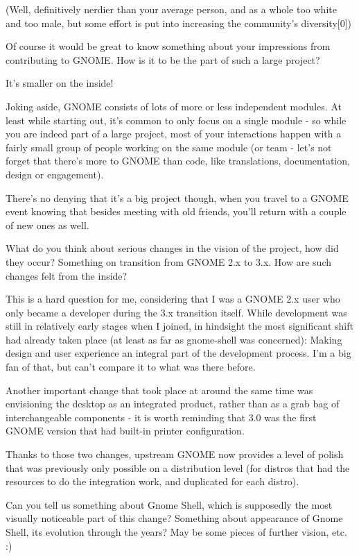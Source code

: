 \documentclass[10pt, a5paper]{article}
\begin{document}
\begin{Parallel}[p]{}{}
{(Well, definitively nerdier than your average person, and as a whole too white and too male, but some effort is put into increasing the community's diversity[0])



\q Of course it would be great to know something about your impressions from
contributing to GNOME. How is it to be the part of such a large project?

\a It's smaller on the inside!

Joking aside, GNOME consists of lots of more or less independent modules. At least while starting out, it's common to only focus on a single module - so while you are indeed part of a large project, most of your interactions happen with a fairly small group of people working on the same module (or team - let's not forget that there's more to GNOME than code, like translations, documentation, design or engagement).

There's no denying that it's a big project though, when you travel to a GNOME event knowing that besides meeting with old friends, you'll return with a couple of new ones as well.


\q What do you think about serious changes in the vision of the project,
how did they occur? Something on transition from GNOME 2.x to 3.x. How are
such changes felt from the inside? 

\a This is a hard question for me, considering that I was a GNOME 2.x user who only became a developer during the 3.x transition itself. While development was still in relatively early stages when I joined, in hindsight the most significant shift had already taken place (at least as far as gnome-shell was concerned): Making design and user experience an integral part of the development process. I'm a big fan of that, but can't compare it to what was there before.

Another important change that took place at around the same time was envisioning the desktop as an integrated product, rather than as a grab bag of interchangeable components - it is worth reminding that 3.0 was the first GNOME version that had built-in printer configuration.

Thanks to those two changes, upstream GNOME now provides a level of polish that was previously only possible on a distribution level (for distros that had the resources to do the integration work, and duplicated for each distro).


\q Can you tell us something about Gnome Shell, which is supposedly the most visually noticeable part of this change? Something about appearance of Gnome Shell, its evolution through the years? May be some pieces of further vision, etc. :)

}
\end{Parallel}
\end{document}
